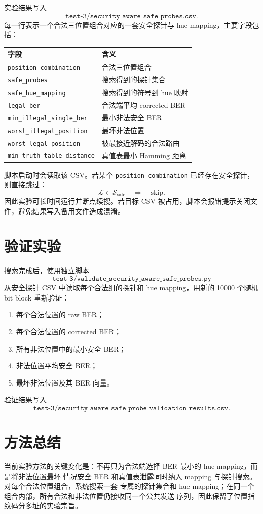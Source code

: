 \documentclass[UTF8,a4paper,11pt]{ctexart}
\begin{document}
实验结果写入
\[
\texttt{test-3/security\_aware\_safe\_probes.csv}.
\]
每一行表示一个合法三位置组合对应的一套安全探针与 hue mapping，主要字段包括：
\begin{center}
\begin{tabular}{ll}
\toprule
字段 & 含义\\
\midrule
\texttt{position\_combination} & 合法三位置组合\\
\texttt{safe\_probes} & 搜索得到的探针集合\\
\texttt{safe\_hue\_mapping} & 搜索得到的符号到 hue 映射\\
\texttt{legal\_ber} & 合法端平均 corrected BER\\
\texttt{min\_illegal\_single\_ber} & 最小非法安全 BER\\
\texttt{worst\_illegal\_position} & 最坏非法位置\\
\texttt{worst\_legal\_position} & 被最接近解码的合法路由\\
\texttt{min\_truth\_table\_distance} & 真值表最小 Hamming 距离\\
\bottomrule
\end{tabular}
\end{center}

脚本启动时会读取该 CSV。若某个 \texttt{position\_combination} 已经存在安全探针，则直接跳过：
\[
\mathcal{L}\in\mathcal{S}_{\mathrm{safe}}
\quad\Rightarrow\quad
\text{skip}.
\]
因此实验可长时间运行并断点续搜。若目标 CSV 被占用，脚本会报错提示关闭文件，避免结果写入备用文件造成混淆。

\section{验证实验}

搜索完成后，使用独立脚本
\[
\texttt{test-3/validate\_security\_aware\_safe\_probes.py}
\]
从安全探针 CSV 中读取每个合法组的探针和 hue mapping，用新的 10000 个随机 bit block 重新验证：
\begin{enumerate}[label=(\arabic*)]
  \item 每个合法位置的 raw BER；
  \item 每个合法位置的 corrected BER；
  \item 所有非法位置中的最小安全 BER；
  \item 非法位置平均安全 BER；
  \item 最坏非法位置及其 BER 向量。
\end{enumerate}
验证结果写入
\[
\texttt{test-3/security\_aware\_safe\_probe\_validation\_results.csv}.
\]

\section{方法总结}

当前实验方法的关键变化是：不再只为合法端选择 BER 最小的 hue mapping，而是将非法位置最坏
情况安全 BER 和真值表泄露同时纳入 mapping 与探针搜索。对每个合法位置组合，系统搜索一套
专属的探针集合和 hue mapping；在同一个组合内部，所有合法和非法位置仍接收同一个公共发送
序列，因此保留了位置指纹码分多址的实验宗旨。
\end{document}

